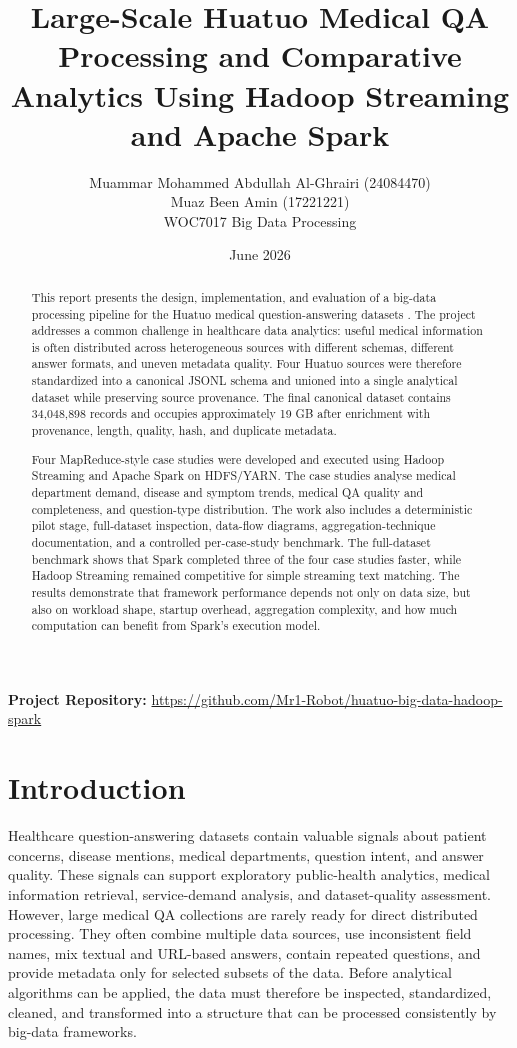 \documentclass[12pt,a4paper]{article}
\title{\textbf{Large-Scale Huatuo Medical QA Processing and Comparative Analytics Using Hadoop Streaming and Apache Spark}}
\author{
Muammar Mohammed Abdullah Al-Ghrairi (24084470)\\
Muaz Been Amin (17221221)\\
WOC7017 Big Data Processing
}
\date{June 2026}
\let\oldsection\section
\renewcommand{\section}{\clearpage\oldsection}
\begin{document}
\maketitle
\begin{center}
\textbf{Project Repository:} \url{https://github.com/Mr1-Robot/huatuo-big-data-hadoop-spark}
\end{center}

\begin{abstract}
This report presents the design, implementation, and evaluation of a big-data processing pipeline for the Huatuo medical question-answering datasets \cite{huatuo26m}. The project addresses a common challenge in healthcare data analytics: useful medical information is often distributed across heterogeneous sources with different schemas, different answer formats, and uneven metadata quality. Four Huatuo sources were therefore standardized into a canonical JSONL schema and unioned into a single analytical dataset while preserving source provenance. The final canonical dataset contains 34,048,898 records and occupies approximately 19 GB after enrichment with provenance, length, quality, hash, and duplicate metadata.

Four MapReduce-style case studies were developed and executed using Hadoop Streaming and Apache Spark on HDFS/YARN. The case studies analyse medical department demand, disease and symptom trends, medical QA quality and completeness, and question-type distribution. The work also includes a deterministic pilot stage, full-dataset inspection, data-flow diagrams, aggregation-technique documentation, and a controlled per-case-study benchmark. The full-dataset benchmark shows that Spark completed three of the four case studies faster, while Hadoop Streaming remained competitive for simple streaming text matching. The results demonstrate that framework performance depends not only on data size, but also on workload shape, startup overhead, aggregation complexity, and how much computation can benefit from Spark's execution model.
\end{abstract}

\section{Introduction}

Healthcare question-answering datasets contain valuable signals about patient concerns, disease mentions, medical departments, question intent, and answer quality. These signals can support exploratory public-health analytics, medical information retrieval, service-demand analysis, and dataset-quality assessment. However, large medical QA collections are rarely ready for direct distributed processing. They often combine multiple data sources, use inconsistent field names, mix textual and URL-based answers, contain repeated questions, and provide metadata only for selected subsets of the data. Before analytical algorithms can be applied, the data must therefore be inspected, standardized, cleaned, and transformed into a structure that can be processed consistently by big-data frameworks.
\end{document}
